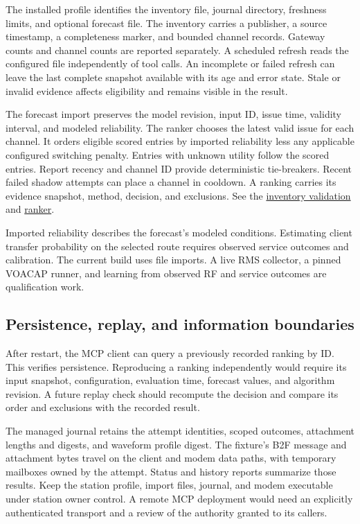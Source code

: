 \documentclass[11pt,a4paper]{article}
\newcommand{\repolink}[2]{\href{https://github.com/8r4n/linkwise/blob/main/#1}{#2}}
\begin{document}
The installed profile identifies the inventory file, journal directory,
freshness limits, and optional forecast file. The inventory carries a
publisher, a source timestamp, a completeness marker, and bounded channel
records. Gateway counts and channel counts are reported separately. A
scheduled refresh reads the configured file independently of tool calls.
An incomplete or failed refresh can leave the last complete snapshot
available with its age and error state. Stale or invalid evidence affects
eligibility and remains visible in the result.

The forecast import preserves the model revision, input ID, issue time,
validity interval, and modeled reliability. The ranker chooses the latest
valid issue for each channel. It orders eligible scored entries by
imported reliability less any applicable configured switching penalty.
Entries with unknown utility follow the scored entries. Report recency
and channel ID provide deterministic tie-breakers. Recent failed shadow
attempts can place a channel in cooldown. A ranking carries its evidence
snapshot, method, decision, and
exclusions. See the \repolink{rust/src/olm/inventory.rs}{inventory
validation} and \repolink{rust/src/olm.rs}{ranker}.

Imported reliability describes the forecast's modeled conditions.
Estimating client transfer probability on the selected route requires
observed service outcomes and calibration. The current build uses file
imports. A live RMS collector, a pinned VOACAP runner, and learning from
observed RF and service outcomes are qualification work.

\subsection{Persistence, replay, and information boundaries}

After restart, the MCP client can query a previously recorded ranking
by ID. This verifies persistence. Reproducing a ranking
independently would require its input snapshot, configuration, evaluation
time, forecast values, and algorithm revision. A future replay check
should recompute the decision and compare its order and exclusions with
the recorded result.

The managed journal retains the attempt identities, scoped outcomes,
attachment lengths and digests, and waveform profile digest. The fixture's
B2F message and attachment bytes travel on the client and modem data
paths, with temporary mailboxes owned by the attempt. Status and history
reports summarize those results. Keep the station profile, import files,
journal, and modem executable under station owner control. A remote MCP
deployment would need an explicitly authenticated transport and a review
of the authority granted to its callers.
\end{document}
